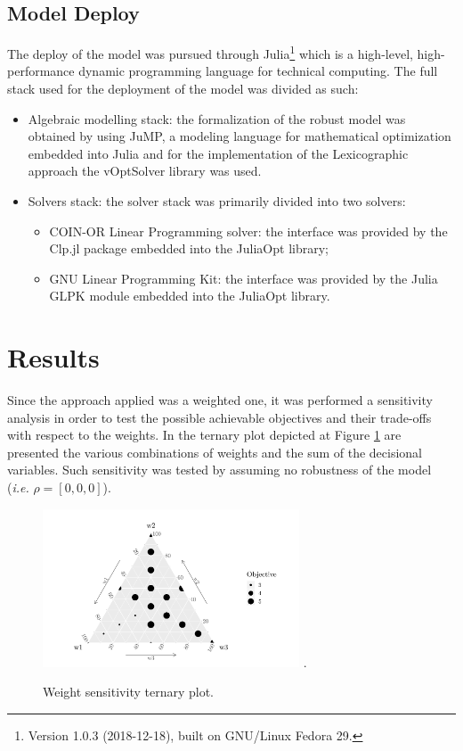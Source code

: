 \documentclass[conference,final,a4paper]{IEEEtran}
\begin{document}
\hypertarget{model-deploy}{%
  \subsection{Model Deploy}\label{model-deploy}}
The deploy of the model was pursued through Julia\footnote{Version 1.0.3 (2018-12-18), built on GNU/Linux Fedora 29.} which is a high-level, high-performance dynamic programming language for technical computing\cite{bezanson17}. The full stack used for the deployment of the model was divided as such:
\begin{itemize}
\item Algebraic modelling stack: the formalization of the robust model was obtained by using JuMP\cite{dunning17}\cite{lubin15}, a modeling language for mathematical optimization embedded into Julia and for the implementation of the Lexicographic approach the vOptSolver\cite{xavier17} library was used.
\item Solvers stack: the solver stack was primarily divided into two solvers:
  \begin{itemize}
  \item COIN-OR\cite{heimer2003} Linear Programming solver: the interface was provided by the Clp.jl package embedded into the JuliaOpt library;
  \item GNU Linear Programming Kit: the interface was provided by the Julia GLPK module embedded into the JuliaOpt library.
  \end{itemize}
\end{itemize}

\hypertarget{results}{%
\section{Results}\label{results}}
Since the approach applied was a weighted one, it was performed a sensitivity analysis \cite{jones11} in order to test the possible achievable objectives and their trade-offs with respect to the weights. In the ternary plot depicted at Figure \ref{tern} are presented the various combinations of weights and the sum of the decisional variables. Such sensitivity was tested by assuming no robustness of the model (\emph{i.e.} $\rho = [0,0,0]$).

\begin{figure}
\centering
\includegraphics[width=3.0in]{figure/ternary.png}
\DeclareGraphicsExtensions.
\caption{Weight sensitivity ternary plot.}
\label{tern}
\end{figure}
\end{document}
